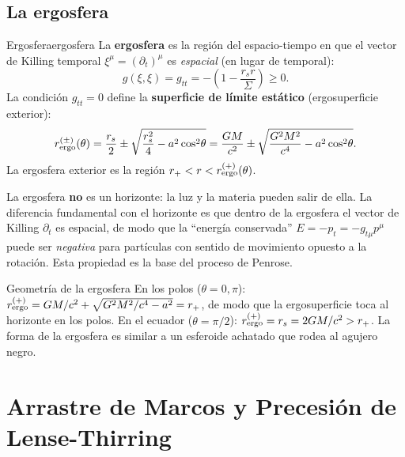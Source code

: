 \subsection{La ergosfera}

\begin{definicion}{Ergosfera}{ergosfera}
La \textbf{ergosfera} es la región del espacio-tiempo en que el vector de Killing temporal $\xi^\mu = (\partial_t)^\mu$ es \emph{espacial} (en lugar de temporal):
\begin{equation}
  g(\xi,\xi) = g_{tt} = -\left(1 - \frac{r_s r}{\Sigma}\right) \geq 0.
  \label{eq:ergo_cond}
\end{equation}
La condición $g_{tt} = 0$ define la \textbf{superficie de límite estático} (ergosuperficie exterior):
\begin{equation}
  r_{\rm ergo}^{(\pm)}(\theta) = \frac{r_s}{2} \pm \sqrt{\frac{r_s^2}{4} - a^2\cos^2\!\theta}
  = \frac{GM}{c^2} \pm \sqrt{\frac{G^2M^2}{c^4} - a^2\cos^2\!\theta}.
  \label{eq:ergosuperficie}
\end{equation}
La ergosfera exterior es la región $r_+ < r < r_{\rm ergo}^{(+)}(\theta)$.
\end{definicion}

\begin{importante}
La ergosfera \textbf{no} es un horizonte: la luz y la materia pueden salir de ella. La diferencia fundamental con el horizonte es que dentro de la ergosfera el vector de Killing $\partial_t$ es espacial, de modo que la ``energía conservada'' $E = -p_t = -g_{t\mu}p^\mu$ puede ser \emph{negativa} para partículas con sentido de movimiento opuesto a la rotación. Esta propiedad es la base del proceso de Penrose.
\end{importante}

\begin{observacion}{Geometría de la ergosfera}{}
En los polos ($\theta = 0, \pi$): $r_{\rm ergo}^{(+)} = GM/c^2 + \sqrt{G^2M^2/c^4 - a^2} = r_+$, de modo que la ergosuperficie toca al horizonte en los polos. En el ecuador ($\theta = \pi/2$): $r_{\rm ergo}^{(+)} = r_s = 2GM/c^2 > r_+$. La forma de la ergosfera es similar a un esferoide achatado que rodea al agujero negro.
\end{observacion}

\section{Arrastre de Marcos y Precesión de Lense-Thirring}
\label{sec:lense_thirring}

